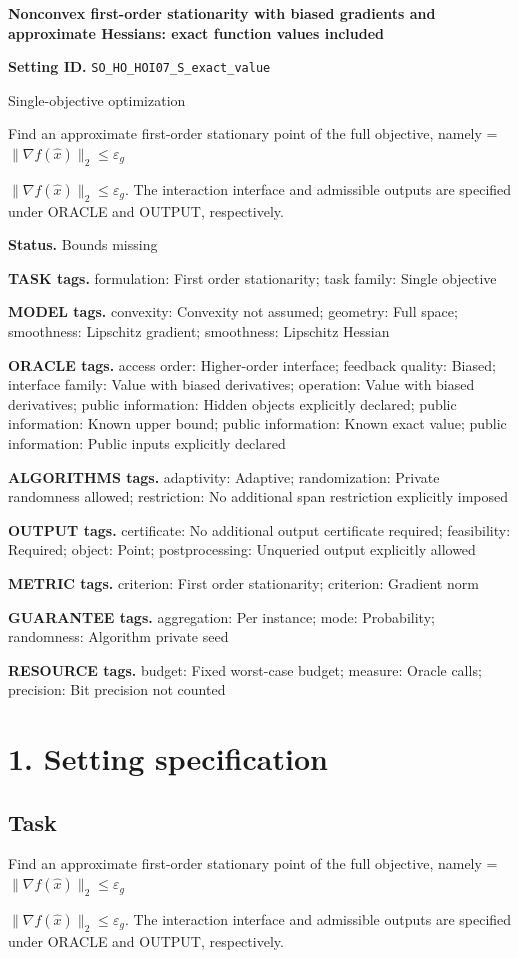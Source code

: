 \documentclass[10pt,a4paper]{article}
\newcommand{\AtlasMath}[1]{\par\begingroup\centering\setbox0=\hbox{$\displaystyle #1$}\ifdim\wd0>1.4\linewidth\typeout{ATLAS WIDE FORMULA: \the\wd0}\fi\ifdim\wd0>\linewidth\resizebox{\linewidth}{!}{\box0}\else\box0\fi\par\endgroup}
\newcommand{\AtlasInlineMath}[1]{\begingroup\setbox0=\hbox{$#1$}\ifdim\wd0>.4\linewidth\endgroup\AtlasMath{#1}\else\endgroup$#1$\fi}
\begin{document}
\raggedright

{\LARGE\bfseries\sffamily\color{AtlasNavy} Nonconvex first-order stationarity with biased gradients and approximate Hessians: exact function values included\par}\vspace{5pt}
\textbf{Setting ID.} \texttt{SO\_\allowbreak{}HO\_\allowbreak{}HOI07\_\allowbreak{}S\_\allowbreak{}exact\_\allowbreak{}value}

Single-objective optimization

Find an approximate first-order stationary point of the full objective, namely \AtlasInlineMath{\|\nabla f(\widehat{x})\|_2\le\varepsilon_g}. The interaction interface and admissible outputs are specified under ORACLE and OUTPUT, respectively.

\textbf{Status.} Bounds missing

\textbf{TASK tags.} formulation: First order stationarity; task family: Single objective

\textbf{MODEL tags.} convexity: Convexity not assumed; geometry: Full space; smoothness: Lipschitz gradient; smoothness: Lipschitz Hessian

\textbf{ORACLE tags.} access order: Higher-order interface; feedback quality: Biased; interface family: Value with biased derivatives; operation: Value with biased derivatives; public information: Hidden objects explicitly declared; public information: Known upper bound; public information: Known exact value; public information: Public inputs explicitly declared

\textbf{ALGORITHMS tags.} adaptivity: Adaptive; randomization: Private randomness allowed; restriction: No additional span restriction explicitly imposed

\textbf{OUTPUT tags.} certificate: No additional output certificate required; feasibility: Required; object: Point; postprocessing: Unqueried output explicitly allowed

\textbf{METRIC tags.} criterion: First order stationarity; criterion: Gradient norm

\textbf{GUARANTEE tags.} aggregation: Per instance; mode: Probability; randomness: Algorithm private seed

\textbf{RESOURCE tags.} budget: Fixed worst-case budget; measure: Oracle calls; precision: Bit precision not counted

\section{1. Setting specification}
\subsection{Task}
Find an approximate first-order stationary point of the full objective, namely \AtlasInlineMath{\|\nabla f(\widehat{x})\|_2\le\varepsilon_g}. The interaction interface and admissible outputs are specified under ORACLE and OUTPUT, respectively.
\end{document}
